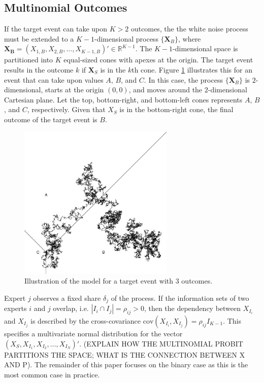 \documentclass[11pt,twoside]{article}
\begin{document}
\subsection{Multinomial Outcomes}
If the target event can take upon $K > 2$ outcomes, the the white noise process must be extended to a $K-1$-dimensional process $\{ \boldsymbol{X}_B \}$, where $\boldsymbol{X_B} = (X_{1,B}, X_{2,B},  \dots, X_{K-1,B})' \in \mathbb{R}^{K-1}$.  The $K-1$-dimensional space is partitioned into $K$ equal-sized cones with apexes at the origin. 
The target event results in the outcome $k$ if $\boldsymbol{X}_S$ is in the $k$th cone. Figure \ref{multinomial} illustrates this for an event that can take upon values $A$, $B$, and $C$. In this case, the process $\{ \boldsymbol{X}_B \}$ is $2$-dimensional, starts at the origin $(0,0)$, and moves around the $2$-dimensional Cartesian plane. Let the top, bottom-right, and bottom-left cones represents $A$, $B$, and $C$, respectively. Given that $X_S$ is in the bottom-right cone, the final outcome of the target event is $B$. 

\begin{figure}[htbp]
   \centering
   \includegraphics[width = 20em]{Multinomial} %
   \caption{Illustration of the model for a target event with $3$ outcomes.}
   \label{multinomial}
\end{figure}

Expert $j$ observes a fixed share $\delta_j$ of the process. If the information sets of two experts $i$ and $j$ overlap, i.e. $| I_i \cap I_j| = \rho_{ij} > 0$, then the dependency between $X_{I_i}$ and $X_{I_j}$ is described by the cross-covariance $\text{cov}(X_{I_i}, X_{I_j}) = \rho_{ij} I_{K-1}$. This specifies a multivariate normal distribution for the vector $(X_S, X_{I_1}, X_{I_2}, \dots, X_{I_N})'$. (EXPLAIN HOW THE MULTINOMIAL PROBIT PARTITIONS THE SPACE; WHAT IS THE CONNECTION BETWEEN X AND P). The remainder of this paper focuses on the binary case as this is the most common case in practice. 
\end{document}
